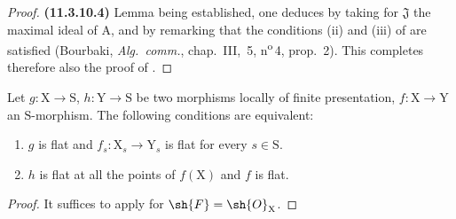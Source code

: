 \begin{proof}
\textbf{(11.3.10.4)} Lemma  being established, one deduces  by taking for $\mathfrak{J}$ the maximal ideal of $\mathrm{A}$, and by remarking that the conditions (ii) and (iii) of  are satisfied (Bourbaki, \emph{Alg.\ comm.}, chap.~III, \textsection\,5, n\textsuperscript{o}\,4, prop.~2). This completes therefore also the proof of .
\end{proof}

\begin{corollary}[11.3.11]
\label{IV.11.3.11}
Let $g:\mathrm{X}\to\mathrm{S}$, $h:\mathrm{Y}\to\mathrm{S}$ be two morphisms locally of finite presentation, $f:\mathrm{X}\to\mathrm{Y}$ an $\mathrm{S}$-morphism. The following conditions are equivalent:
\begin{enumerate}[label=\emph{\alph*)}]
  \item $g$ is flat and $f_s:\mathrm{X}_s\to\mathrm{Y}_s$ is flat for every $s\in\mathrm{S}$.
  \item $h$ is flat at all the points of $f(\mathrm{X})$ and $f$ is flat.
\end{enumerate}
\end{corollary}

\begin{proof}
It suffices to apply  for $\sh{F}=\sh{O}_\mathrm{X}$.
\end{proof}

